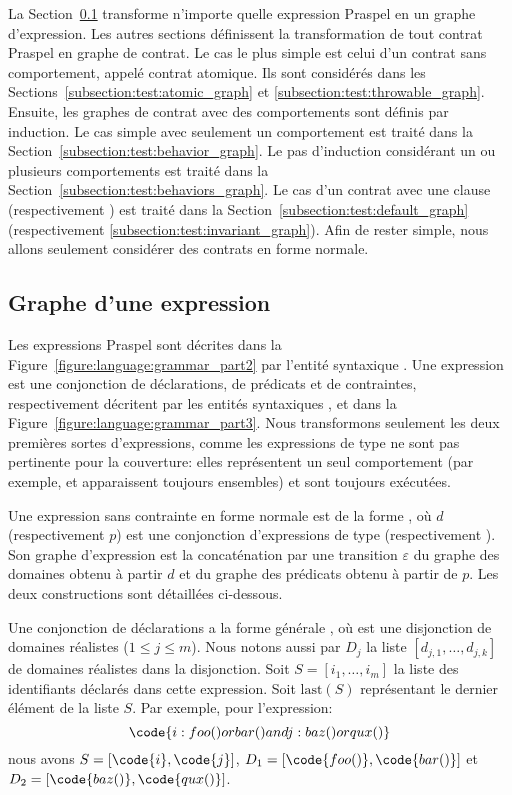 La Section~\ref{subsection:test:expression_graph} transforme n'importe quelle
expression Praspel en un graphe d'expression. Les autres sections définissent la
transformation de tout contrat Praspel en graphe de contrat. Le cas le plus
simple est celui d'un contrat sans comportement, appelé {\strong contrat
atomique}. Ils sont considérés dans les
Sections~\ref{subsection:test:atomic_graph} et
\ref{subsection:test:throwable_graph}. Ensuite, les graphes de contrat avec des
comportements sont définis par induction. Le cas simple avec seulement un
comportement est traité dans la Section~\ref{subsection:test:behavior_graph}. Le
pas d'induction considérant un ou plusieurs comportements est traité dans la
Section~\ref{subsection:test:behaviors_graph}. Le cas d'un contrat avec une
clause \adefault (respectivement \ainvariant) est traité dans la
Section~\ref{subsection:test:default_graph} (respectivement
\ref{subsection:test:invariant_graph}). Afin de rester simple, nous allons
seulement considérer des contrats en forme normale.

\subsection{Graphe d'une expression}
\label{subsection:test:expression_graph}

Les expressions Praspel sont décrites dans la
Figure~\ref{figure:language:grammar_part2} par l'entité syntaxique
. Une expression est une conjonction de déclarations, de
prédicats et de contraintes, respectivement décritent par les entités
syntaxiques ,  et  dans la
Figure~\ref{figure:language:grammar_part3}. Nous transformons seulement les deux
premières sortes d'expressions, comme les expressions de type 
ne sont pas pertinente pour la couverture: elles représentent un seul
comportement (par exemple,  et 
apparaissent toujours ensembles) et sont toujours exécutées.

Une expression sans contrainte en forme normale est de la forme , où $d$ (respectivement $p$) est une conjonction d'expressions de type
 (respectivement ). Son graphe d'expression
est la concaténation par une transition $\varepsilon$ du {\strong graphe des
domaines} obtenu à partir $d$ et du {\strong graphe des prédicats} obtenu à
partir de $p$. Les deux constructions sont détaillées ci-dessous.

Une conjonction de déclarations a la forme générale , où  est
une disjonction de domaines réalistes ($1 \leq j \leq m$). Nous notons aussi par
$D_j$ la liste $[d_{j,1}, \dots, d_{j,k}]$ de domaines réalistes dans la
disjonction. Soit $S = [i_1, \dots, i_m]$ la liste des identifiants déclarés
dans cette expression. Soit $\mathrm{last}(S)$ représentant le dernier élément
de la liste $S$. Par exemple, pour l'expression:
%
$$\code{i: foo() or bar() and j: baz() or qux()}$$
%
nous avons $S = [\code{i}, \code{j}]$, $D_1 = [\code{foo()}, \code{bar()}]$ et
$D_2 = [\code{baz()}, \code{qux()}]$.

